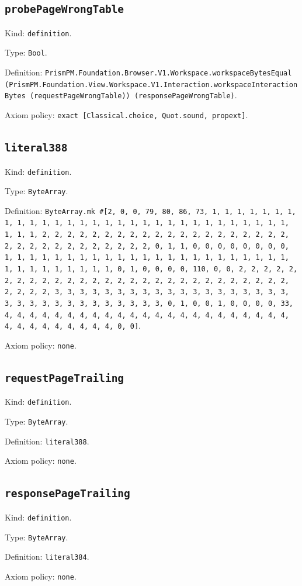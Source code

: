 \documentclass[11pt]{article}
\begin{document}
\subsection*{\texttt{probePageWrongTable}}
\noindent Kind: \texttt{definition}.\par
\noindent Type: \texttt{Bool}.\par
\noindent Definition: \texttt{PrismPM.Foundation.Browser.V1.Workspace.workspaceBytesEqual (PrismPM.Foundation.View.Workspace.V1.Interaction.workspaceInteractionBytes (requestPageWrongTable)) (responsePageWrongTable)}.\par
\noindent Axiom policy: \texttt{exact [Classical.choice, Quot.sound, propext]}.\par
\subsection*{\texttt{literal388}}
\noindent Kind: \texttt{definition}.\par
\noindent Type: \texttt{ByteArray}.\par
\noindent Definition: \texttt{ByteArray.mk \#[2, 0, 0, 79, 80, 86, 73, 1, 1, 1, 1, 1, 1, 1, 1, 1, 1, 1, 1, 1, 1, 1, 1, 1, 1, 1, 1, 1, 1, 1, 1, 1, 1, 1, 1, 1, 1, 1, 1, 1, 2, 2, 2, 2, 2, 2, 2, 2, 2, 2, 2, 2, 2, 2, 2, 2, 2, 2, 2, 2, 2, 2, 2, 2, 2, 2, 2, 2, 2, 2, 2, 2, 0, 1, 1, 0, 0, 0, 0, 0, 0, 0, 0, 1, 1, 1, 1, 1, 1, 1, 1, 1, 1, 1, 1, 1, 1, 1, 1, 1, 1, 1, 1, 1, 1, 1, 1, 1, 1, 1, 1, 1, 1, 1, 1, 0, 1, 0, 0, 0, 0, 110, 0, 0, 2, 2, 2, 2, 2, 2, 2, 2, 2, 2, 2, 2, 2, 2, 2, 2, 2, 2, 2, 2, 2, 2, 2, 2, 2, 2, 2, 2, 2, 2, 2, 2, 3, 3, 3, 3, 3, 3, 3, 3, 3, 3, 3, 3, 3, 3, 3, 3, 3, 3, 3, 3, 3, 3, 3, 3, 3, 3, 3, 3, 3, 3, 3, 3, 0, 1, 0, 0, 1, 0, 0, 0, 0, 33, 4, 4, 4, 4, 4, 4, 4, 4, 4, 4, 4, 4, 4, 4, 4, 4, 4, 4, 4, 4, 4, 4, 4, 4, 4, 4, 4, 4, 4, 4, 4, 4, 0, 0]}.\par
\noindent Axiom policy: \texttt{none}.\par
\subsection*{\texttt{requestPageTrailing}}
\noindent Kind: \texttt{definition}.\par
\noindent Type: \texttt{ByteArray}.\par
\noindent Definition: \texttt{literal388}.\par
\noindent Axiom policy: \texttt{none}.\par
\subsection*{\texttt{responsePageTrailing}}
\noindent Kind: \texttt{definition}.\par
\noindent Type: \texttt{ByteArray}.\par
\noindent Definition: \texttt{literal384}.\par
\noindent Axiom policy: \texttt{none}.\par
\end{document}
